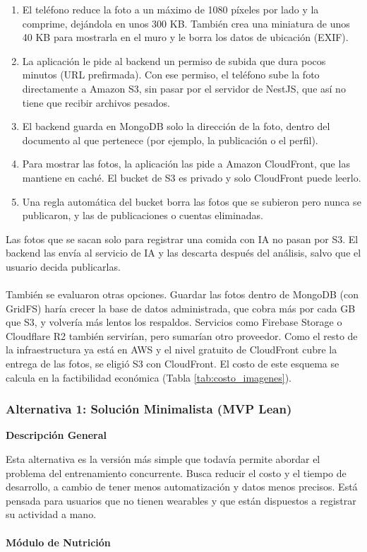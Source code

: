 \begin{enumerate}
    \item El teléfono reduce la foto a un máximo de 1080 píxeles por lado y la comprime, dejándola en unos 300 KB. También crea una miniatura de unos 40 KB para mostrarla en el muro y le borra los datos de ubicación (EXIF).
    \item La aplicación le pide al backend un permiso de subida que dura pocos minutos (URL prefirmada). Con ese permiso, el teléfono sube la foto directamente a Amazon S3, sin pasar por el servidor de NestJS, que así no tiene que recibir archivos pesados.
    \item El backend guarda en MongoDB solo la dirección de la foto, dentro del documento al que pertenece (por ejemplo, la publicación o el perfil).
    \item Para mostrar las fotos, la aplicación las pide a Amazon CloudFront, que las mantiene en caché. El bucket de S3 es privado y solo CloudFront puede leerlo.
    \item Una regla automática del bucket borra las fotos que se subieron pero nunca se publicaron, y las de publicaciones o cuentas eliminadas.
\end{enumerate}

Las fotos que se sacan solo para registrar una comida con IA no pasan por S3. El backend las envía al servicio de IA y las descarta después del análisis, salvo que el usuario decida publicarlas.
\\\\
También se evaluaron otras opciones. Guardar las fotos dentro de MongoDB (con GridFS) haría crecer la base de datos administrada, que cobra más por cada GB que S3, y volvería más lentos los respaldos. Servicios como Firebase Storage o Cloudflare R2 también servirían, pero sumarían otro proveedor. Como el resto de la infraestructura ya está en AWS y el nivel gratuito de CloudFront cubre la entrega de las fotos, se eligió S3 con CloudFront. El costo de este esquema se calcula en la factibilidad económica (Tabla \ref{tab:costo_imagenes}).

\subsubsection{Alternativa 1: Solución Minimalista (MVP Lean)}

\textbf{Descripción General}

Esta alternativa es la versión más simple que todavía permite abordar el problema del entrenamiento concurrente. Busca reducir el costo y el tiempo de desarrollo, a cambio de tener menos automatización y datos menos precisos. Está pensada para usuarios que no tienen wearables y que están dispuestos a registrar su actividad a mano.
\\\\
\textbf{Módulo de Nutrición}


